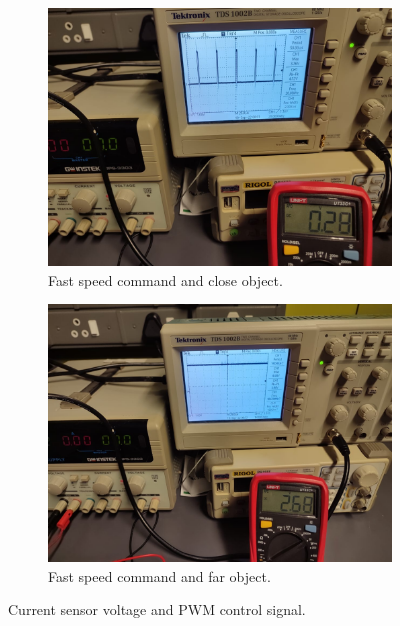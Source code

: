 \begin{figure}[H]
\begin{subfigure}[]{0.4\textwidth}
\label{subfig:mtrctrl_left_prac_sc}	
\end{subfigure}
\begin{subfigure}[]{0.4\textwidth}
\includegraphics[width=\linewidth]{./Figures/CurSens_Left_fc.jpeg}
\caption{Fast speed command and close object.}
\label{subfig:mtrctrl_left_prac_fc}	
\end{subfigure}
\hfill
\begin{subfigure}[]{0.4\textwidth}
\includegraphics[width=\linewidth]{./Figures/CurSens_Left_ff.jpeg}
\caption{Fast speed command and far object.} 			
\label{subfig:mtrctrl_left_prac_ff}	
\end{subfigure}
\caption{Current sensor voltage and PWM control signal.}
\label{fig:mtrctrl_left_prac}
\end{figure}

